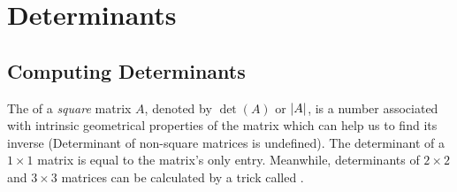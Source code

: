 \section{Determinants}
\label{section:det}
\subsection{Computing Determinants}
The  of a \textit{square} matrix $A$, denoted by $\det(A)$ or $\abs{A}$, is a number associated with intrinsic geometrical properties of the matrix which can help us to find its inverse (Determinant of non-square matrices is undefined). The determinant of a $1 \times 1$ matrix is equal to the matrix's only entry. Meanwhile, determinants of $2 \times 2$ and $3 \times 3$ matrices can be calculated by a trick called .
